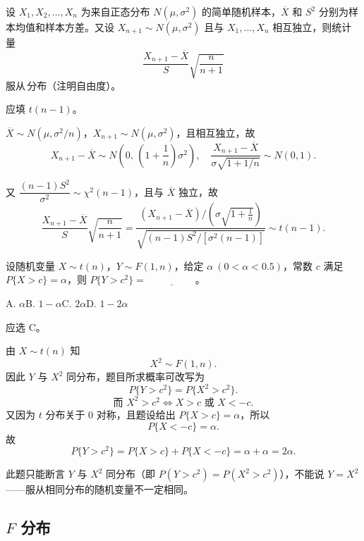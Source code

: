 ﻿\documentclass[lang=cn,11pt]{elegantbook}
\begin{document}
\begin{exercise}\label{exer:6-t-new}
设 \(X_1, X_2, \dots, X_n\) 为来自正态分布 \(N(\mu, \sigma^2)\) 的简单随机样本，\(\overline{X}\) 和 \(S^2\) 分别为样本均值和样本方差。又设 \(X_{n+1} \sim N(\mu, \sigma^2)\) 且与 \(X_1, \dots, X_n\) 相互独立，则统计量
\[
\frac{X_{n+1} - \overline{X}}{S}\sqrt{\frac{n}{n+1}}
\]
服从\,\underline{\hspace{2cm}}分布（注明自由度）。
\end{exercise}

\begin{solution}
应填 \(t(n-1)\)。

\(\overline{X} \sim N(\mu, \sigma^2/n)\)，\(X_{n+1} \sim N(\mu, \sigma^2)\)，且相互独立，故
\[
X_{n+1} - \overline{X} \sim N\!\left(0,\, \left(1+\frac{1}{n}\right)\sigma^2\right),\quad \frac{X_{n+1}-\overline{X}}{\sigma\sqrt{1+1/n}} \sim N(0,1).
\]

又 \(\dfrac{(n-1)S^2}{\sigma^2} \sim \chi^2(n-1)\)，且与 \(\overline{X}\) 独立，故
\[
\frac{X_{n+1}-\overline{X}}{S}\sqrt{\frac{n}{n+1}} = \frac{(X_{n+1}-\overline{X})\big/\!\left(\sigma\sqrt{1+\frac{1}{n}}\right)}{\sqrt{(n-1)S^2/[\sigma^2(n-1)]}} \sim t(n-1).
\]
\end{solution}

\begin{exercise}\label{exer:6-t-y-sq}
设随机变量 \(X \sim t(n)\)，\(Y \sim F(1,n)\)，给定 \(\alpha\ (0 < \alpha < 0.5)\)，常数 \(c\) 满足 \(P\{X > c\} = \alpha\)，则 \(P\{Y > c^2\} =\,\underline{\hspace{2cm}}\)。\par
A. \(\alpha\)\quad B. \(1-\alpha\)\quad C. \(2\alpha\)\quad D. \(1-2\alpha\)
\end{exercise}
\begin{solution}
应选 C。

由 \(X \sim t(n)\) 知
\[
X^2 \sim F(1,n).
\]
因此 \(Y\) 与 \(X^2\) 同分布，题目所求概率可改写为
\[
P\{Y > c^2\} = P\{X^2 > c^2\}.
\]
\[
\text{而 } X^2>c^2 \Longleftrightarrow X>c \text{ 或 } X<-c.
\]
又因为 \(t\) 分布关于 0 对称，且题设给出 \(P\{X>c\}=\alpha\)，所以
\[
P\{X<-c\}=\alpha.
\]
故
\[
P\{Y > c^2\} = P\{X > c\} + P\{X < -c\} = \alpha + \alpha = 2\alpha.
\]
\begin{note}
此题只能断言 \(Y\) 与 \(X^2\) 同分布（即 \(P(Y>c^2)=P(X^2>c^2)\)），不能说 \(Y=X^2\)——服从相同分布的随机变量不一定相同。
\end{note}
\end{solution}

\subsection{\texorpdfstring{\(F\)}{F} 分布}
\end{document}
